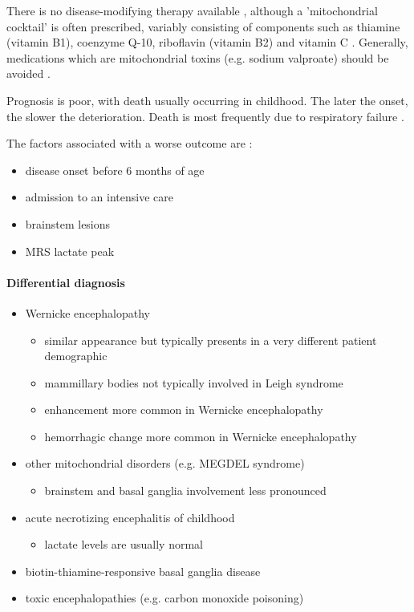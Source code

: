 There is no disease-modifying therapy available , although a 'mitochondrial cocktail' is often prescribed, variably consisting of components such as thiamine (vitamin B1), coenzyme Q-10, riboflavin (vitamin B2) and vitamin C . Generally, medications which are mitochondrial toxins (e.g. sodium valproate) should be avoided .

Prognosis is poor, with death usually occurring in childhood. The later the onset, the slower the deterioration. Death is most frequently due to respiratory failure .

The factors associated with a worse outcome are :

\begin{itemize}
	\item
	disease onset before 6 months of age
	\item
	admission to an intensive care
	\item
	brainstem lesions
	\item
	MRS lactate peak
\end{itemize}

\paragraph{Differential diagnosis}

\begin{itemize}
	\item
	Wernicke encephalopathy
	
	\begin{itemize}
		\item
		similar appearance but typically presents in a very different patient demographic
		\item
		mammillary bodies not typically involved in Leigh syndrome
		\item
		enhancement more common in Wernicke encephalopathy
		\item
		hemorrhagic change more common in Wernicke encephalopathy 
	\end{itemize}
	\item
	other mitochondrial disorders (e.g. MEGDEL syndrome)
	
	\begin{itemize}
		\item
		brainstem and basal ganglia involvement less pronounced
	\end{itemize}
	\item
	acute necrotizing encephalitis of childhood
	
	\begin{itemize}
		\item
		lactate levels are usually normal
	\end{itemize}
	\item
	biotin-thiamine-responsive basal ganglia disease
	\item
	toxic encephalopathies (e.g. carbon monoxide poisoning)
\end{itemize}
